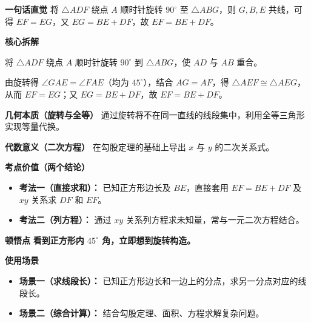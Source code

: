 \begin{explanationbox}
	\textbf{\textcolor{CExplanation}{一句话直觉}}
	将 $\triangle ADF$ 绕点 $A$ 顺时针旋转 $90^\circ$ 至 $\triangle ABG$，则 $G, B, E$ 共线，可得 $EF = EG$，又 $EG = BE + DF$，故 $EF = BE + DF$。

	\medskip
	\textbf{\textcolor{CExplanation}{核心拆解}}
	\begin{description}[style=nextline, leftmargin=2.8em, labelsep=0.5em, itemsep=0.45em]
		\item[\textbf{要点一（旋转构造）：}]
			将 $\triangle ADF$ 绕点 $A$ 顺时针旋转 $90^\circ$ 到 $\triangle ABG$，使 $AD$ 与 $AB$ 重合。
		\item[\textbf{要点二（全等共线）：}]
			由旋转得 $\angle GAE = \angle FAE$（均为 $45^\circ$），结合 $AG = AF$，得 $\triangle AEF \cong \triangle AEG$，从而 $EF = EG$；又 $EG = BE + DF$，故 $EF = BE + DF$。
	\end{description}

	\medskip
	\textbf{\textcolor{CExplanation}{几何本质（旋转与全等）}}
	通过旋转将不在同一直线的线段集中，利用全等三角形实现等量代换。

	\medskip
	\textbf{\textcolor{CExplanation}{代数意义（二次方程）}}
	在勾股定理的基础上导出 $x$ 与 $y$ 的二次关系式。

	\medskip
	\textbf{\textcolor{CExplanation}{考点价值（两个结论）}}
	\begin{itemize}[leftmargin=*, itemsep=0.5em, topsep=0.4em]
		\item \textbf{考法一（直接求和）：} 已知正方形边长及 $BE$，直接套用 $EF = BE+DF$ 及 $xy$ 关系求 $DF$ 和 $EF$。
		\item \textbf{考法二（列方程）：} 通过 $xy$ 关系列方程求未知量，常与一元二次方程结合。
	\end{itemize}

	\medskip
	\textbf{\textcolor{CExplanation}{顿悟点}}
	\textbf{看到正方形内 $45^\circ$ 角，立即想到旋转构造。}

	\medskip
	\textbf{\textcolor{CExplanation}{使用场景}}
	\begin{itemize}[leftmargin=*, itemsep=0.5em, topsep=0.4em]
		\item \textbf{场景一（求线段长）：} 已知正方形边长和一边上的分点，求另一分点对应的线段长。
		\item \textbf{场景二（综合计算）：} 结合勾股定理、面积、方程求解复杂问题。
	\end{itemize}

\end{explanationbox}

